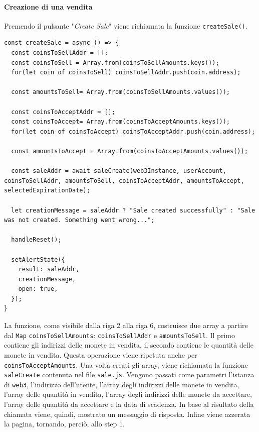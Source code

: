 \documentclass[a4paper]{article}
\begin{document}
        \paragraph{Creazione di una vendita}
        Premendo il pulsante "\emph{Create Sale}" viene richiamata la funzione \verb|createSale()|.
\begin{lstlisting}[style=ES6, title={Funzione createSale()}]
const createSale = async () => {
  const coinsToSellAddr = [];
  const coinsToSell = Array.from(coinsToSellAmounts.keys());
  for(let coin of coinsToSell) coinsToSellAddr.push(coin.address);

  const amountsToSell= Array.from(coinsToSellAmounts.values());

  const coinsToAcceptAddr = [];
  const coinsToAccept= Array.from(coinsToAcceptAmounts.keys());
  for(let coin of coinsToAccept) coinsToAcceptAddr.push(coin.address);

  const amountsToAccept = Array.from(coinsToAcceptAmounts.values());
  
  const saleAddr = await saleCreate(web3Instance, userAccount, coinsToSellAddr, amountsToSell, coinsToAcceptAddr, amountsToAccept, selectedExpirationDate);

  let creationMessage = saleAddr ? "Sale created successfully" : "Sale was not created. Something went wrong...";
              
  handleReset();
  
  setAlertState({
    result: saleAddr,
    creationMessage,
    open: true,
  });
}\end{lstlisting}
        La funzione, come visibile dalla riga 2 alla riga 6, costruisce due array a partire dal \verb|Map| \verb|coinsToSellAmounts|: \verb|coinsToSellAddr| e \verb|amountsToSell|.
        Il primo contiene gli indirizzi delle monete in vendita, il secondo contiene le quantità delle monete in vendita. Questa operazione viene ripetuta anche per \verb|coinsToAcceptAmounts|.
        Una volta creati gli array, viene richiamata la funzione \verb|saleCreate| contenuta nel file \verb|sale.js|. Vengono passati come parametri l'istanza di \verb|web3|, l'indirizzo dell'utente, l'array degli indirizzi delle monete in vendita,
        l'array delle quantità in vendita, l'array degli indirizzi delle monete da accettare, l'array delle quantità da accettare e la data di scadenza.
        In base al risultato della chiamata viene, quindi, mostrato un messaggio di risposta. Infine viene azzerata la pagina, tornando, perciò, allo step 1.
\end{document}
